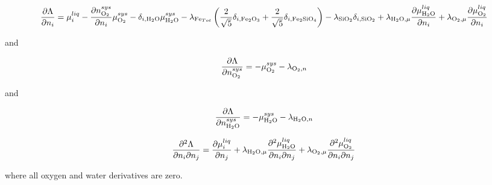 \documentclass[11pt, titlepage, twoside]{article}
\begin{document}
\begin{MPEquation}[!ht]
\begin{equation}
\frac{{\partial \Lambda }}{{\partial {n_i}}} = \mu _i^{liq} - \frac{{\partial n_{{{\rm{O}}_2}}^{sys}}}{{\partial {n_i}}}\mu _{{{\rm{O}}_2}}^{sys} - {\delta _{i,{{\rm{H}}_2}{\rm{O}}}}\mu _{{{\rm{H}}_2}{\rm{O}}}^{sys} - {\lambda _{{\rm{F}}{{\rm{e}}_{Tot}}}}\left( {\frac{2}{{\sqrt 5 }}{\delta _{i,{\rm{F}}{{\rm{e}}_2}{{\rm{O}}_3}}} + \frac{2}{{\sqrt 5 }}{\delta _{i,{\rm{F}}{{\rm{e}}_2}{\rm{Si}}{{\rm{O}}_4}}}} \right) - {\lambda _{{\rm{Si}}{{\rm{O}}_2}}}{\delta _{i,{\rm{Si}}{{\rm{O}}_2}}} + {\lambda _{{{\rm{H}}_{\rm{2}}}{\rm{O,}}\mu }}\frac{{\partial \mu _{{{\rm{H}}_{\rm{2}}}{\rm{O}}}^{liq}}}{{\partial {n_i}}} + {\lambda _{{{\rm{O}}_2},\mu }}\frac{{\partial \mu _{{{\rm{O}}_2}}^{liq}}}{{\partial {n_i}}}
\end{equation}
\label{MPEquationElement:26A9526D-B5CA-426A-A2C8-4DD456D29296}
\end{MPEquation}
and


\begin{MPEquation}[!ht]
\begin{equation}
\frac{{\partial \Lambda }}{{\partial n_{{{\rm{O}}_2}}^{sys}}} =  - \mu _{{{\rm{O}}_2}}^{sys} - {\lambda _{{{\rm{O}}_2},n}}
\end{equation}
\label{MPEquationElement:DA281CF5-CE28-4D23-9EA4-14195FC70830}
\end{MPEquation}
and


\begin{MPEquation}[!ht]
\begin{equation}
\frac{{\partial \Lambda }}{{\partial n_{{{\rm{H}}_2}{\rm{O}}}^{sys}}} =  - \mu _{{{\rm{H}}_2}{\rm{O}}}^{sys} - {\lambda _{{{\rm{H}}_2}{\rm{O}},n}}
\end{equation}
\label{MPEquationElement:617332EE-4C4D-49C7-A82A-8566EBC225E7}
\end{MPEquation}



\begin{MPEquation}[!ht]
\begin{equation}
\frac{{{\partial ^2}\Lambda }}{{\partial {n_i}\partial {n_j}}} = \frac{{\partial \mu _i^{liq}}}{{\partial {n_j}}} + {\lambda _{{{\rm{H}}_{\rm{2}}}{\rm{O,}}\mu }}\frac{{{\partial ^2}\mu _{{{\rm{H}}_{\rm{2}}}{\rm{O}}}^{liq}}}{{\partial {n_i}\partial {n_j}}} + {\lambda _{{{\rm{O}}_2},\mu }}\frac{{{\partial ^2}\mu _{{{\rm{O}}_2}}^{liq}}}{{\partial {n_i}\partial {n_j}}}
\end{equation}
\label{MPEquationElement:572F6FA4-6EDD-4673-C681-9580EFCE816A}
\end{MPEquation}
where all oxygen and water derivatives are zero.
\end{document}

